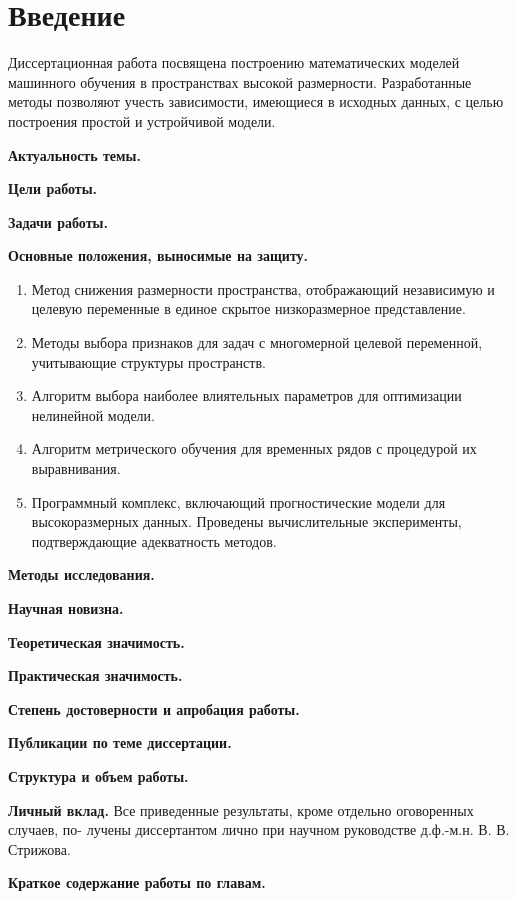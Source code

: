 \chapter*{Введение}

Диссертационная работа посвящена построению математических моделей машинного обучения в пространствах высокой размерности.
Разработанные методы позволяют учесть зависимости, имеющиеся в исходных данных, с целью построения простой и устройчивой модели.


\textbf{Актуальность темы.} 

\vspace{0.5cm}
\textbf{Цели работы.}

\vspace{0.5cm}
\textbf{Задачи работы.}

\vspace{0.5cm}
\textbf{Основные положения, выносимые на защиту.}
\begin{enumerate}
	\item Метод снижения размерности пространства, отображающий независимую и целевую переменные в единое скрытое низкоразмерное представление.
	\item Методы выбора признаков для задач с многомерной целевой переменной, учитывающие структуры пространств.
	\item Алгоритм выбора наиболее влиятельных параметров для оптимизации нелинейной модели.
	\item Алгоритм метрического обучения для временных рядов с процедурой их выравнивания.
	\item Программный комплекс, включающий прогностические модели для высокоразмерных данных. Проведены вычислительные эксперименты, подтверждающие адекватность методов.
\end{enumerate}

\vspace{0.5cm}
\textbf{Методы исследования.}

\vspace{0.5cm}
\textbf{Научная новизна.}

\vspace{0.5cm}
\textbf{Теоретическая значимость.}

\vspace{0.5cm}
\textbf{Практическая значимость.}

\vspace{0.5cm}
\textbf{Степень достоверности и апробация работы.}

\vspace{0.5cm}
\textbf{Публикации по теме диссертации.}

\vspace{0.5cm}
\textbf{Структура и объем работы.}

\vspace{0.5cm}
\textbf{Личный вклад.}
Все приведенные результаты, кроме отдельно оговоренных случаев, по- лучены диссертантом лично при научном руководстве д.ф.-м.н. В. В. Стрижова.

\vspace{0.5cm}
\textbf{Краткое содержание работы по главам.}